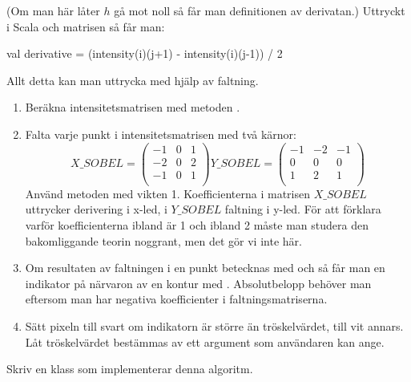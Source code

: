 (Om man här låter $h$ gå mot noll så får man definitionen av derivatan.) Uttryckt i Scala och matrisen  så får man:

\begin{Code}
val derivative = (intensity(i)(j+1) - intensity(i)(j-1)) / 2
\end{Code}

Allt detta kan man uttrycka med hjälp av faltning.

\begin{enumerate}
	\item Beräkna intensitetsmatrisen med metoden .
	\item Falta varje punkt i intensitetsmatrisen med två kärnor:
$$
X\_SOBEL =
\begin{pmatrix}
  -1 & 0 & 1 \\
  -2 & 0 & 2 \\
  -1 & 0 & 1 \\
\end{pmatrix}
Y\_SOBEL =
\begin{pmatrix}
  -1 & -2 & -1 \\
  0 & 0 & 0 \\
  1 & 2 & 1 \\
\end{pmatrix}
$$
	Använd metoden  med vikten 1. Koefficienterna i matrisen $X\_SOBEL$ uttrycker derivering i x-led, i $Y\_SOBEL$ faltning i y-led. För att förklara varför koefficienterna ibland är 1 och ibland 2 måste man studera den bakomliggande teorin noggrant, men det gör vi inte här.
	\item Om resultaten av faltningen i en punkt betecknas med  och  så får man en indikator på närvaron av en kontur med . Absolutbelopp behöver man eftersom man har negativa koefficienter i faltningsmatriserna.
	\item  Sätt pixeln till svart om indikatorn är större än tröskelvärdet, till vit annars. Låt tröskelvärdet bestämmas av ett argument som användaren kan ange.
\end{enumerate}

Skriv en klass  som implementerar denna algoritm.


